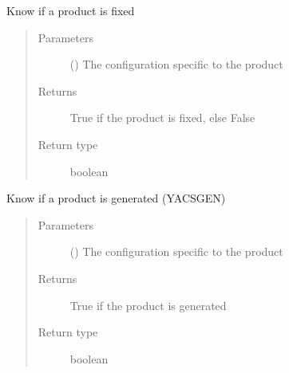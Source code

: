 \documentclass[a4paper,10pt,english]{sphinxmanual}
\begin{document}

\begin{fulllineitems}
\label{\detokenize{commands/apidoc/src:src.product.product_is_fixed}}
Know if a product is fixed
\begin{quote}\begin{description}
\item[{Parameters}] \leavevmode
{} () \textendash{} The configuration specific to 
the product

\item[{Returns}] \leavevmode
True if the product is fixed, else False

\item[{Return type}] \leavevmode
boolean

\end{description}\end{quote}

\end{fulllineitems}


\begin{fulllineitems}
\label{\detokenize{commands/apidoc/src:src.product.product_is_generated}}
Know if a product is generated (YACSGEN)
\begin{quote}\begin{description}
\item[{Parameters}] \leavevmode
{} () \textendash{} The configuration specific to 
the product

\item[{Returns}] \leavevmode
True if the product is generated

\item[{Return type}] \leavevmode
boolean

\end{description}\end{quote}

\end{fulllineitems}
\end{document}
